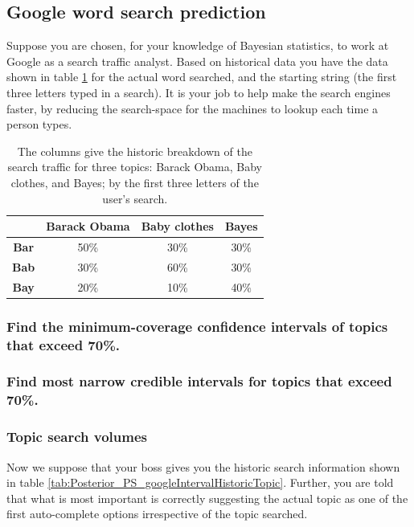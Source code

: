 \documentclass[11pt,fullpage]{book}
\begin{document}
\subsection{Google word search prediction}
Suppose you are chosen, for your knowledge of Bayesian statistics, to work at Google as a search traffic analyst. Based on historical data you have the data shown in table \ref{tab:Posterior_PS_googleInterval} for the actual word searched, and the starting string (the first three letters typed in a search). It is your job to help make the search engines faster, by reducing the search-space for the machines to lookup each time a person types.

\begin{table}[htbp]
  \centering
    \begin{tabular}{cccc}
    \toprule
          & \textbf{Barack Obama} & \textbf{Baby clothes} & \textbf{Bayes} \\
    \midrule
    \textbf{Bar} & 50\%  & 30\%  & 30\% \\
    \textbf{Bab} & 30\%  & 60\%  & 30\% \\
    \textbf{Bay} & 20\%  & 10\%  & 40\% \\
    \bottomrule
    \end{tabular}%
  \caption{The columns give the historic breakdown of the search traffic for three topics: Barack Obama, Baby clothes, and Bayes; by the first three letters of the user's search.}\label{tab:Posterior_PS_googleInterval}%
\end{table}%


\subsubsection{Find the minimum-coverage confidence intervals of topics that exceed 70\%.}
\subsubsection{Find most narrow credible intervals for topics that exceed 70\%.}

\subsubsection{Topic search volumes}
Now we suppose that your boss gives you the historic search information shown in table \ref{tab:Posterior_PS_googleIntervalHistoricTopic}. Further, you are told that what is most important is correctly suggesting the actual topic as one of the first auto-complete options irrespective of the topic searched.
\end{document}

